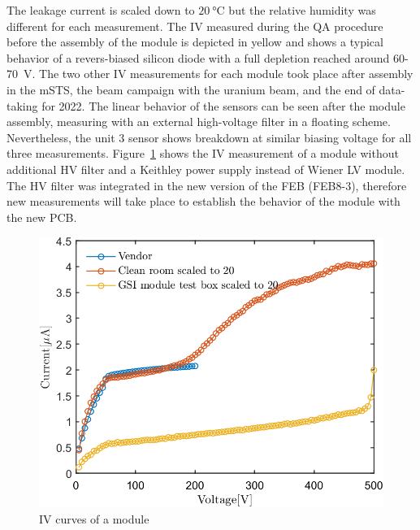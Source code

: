 The leakage current is scaled down to $\SI{20}{\celsius}$ but the relative humidity was different for each measurement. The IV measured during the QA procedure before the assembly of the module is depicted in yellow and shows a typical behavior of a revers-biased silicon diode with a full depletion reached around 60-70~V. The two other IV measurements for each module took place after assembly in the \gls{mSTS}, the beam campaign with the uranium beam, and the end of data-taking for 2022. The linear behavior of the sensors can be seen after the module assembly, measuring with an external high-voltage filter in a floating scheme. Nevertheless, the unit 3 sensor shows breakdown at similar biasing voltage for all three measurements. Figure~\ref{fig_IV_good} shows the IV measurement of a module without additional \gls{HV} filter and a Keithley power supply instead of Wiener \gls{LV} module. The \gls{HV} filter was integrated in the new version of the \gls{FEB} (FEB8-3), therefore new measurements will take place to establish the behavior of the module with the new PCB.

\begin{figure}[!h]
\centering
\includegraphics[width=0.5\columnwidth]{Chapter6/DCS/images/IV/30304Whole.png}
\caption{IV curves of a module}
\label{fig_IV_good}
\end{figure}

\newpage
